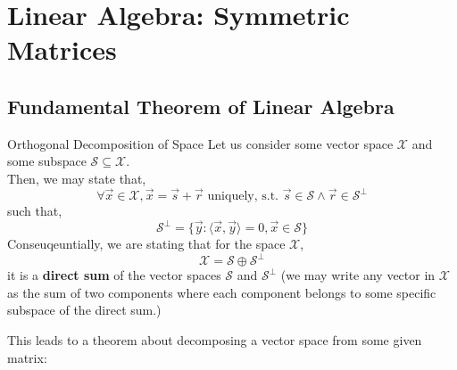 \chapter{Linear Algebra: Symmetric Matrices}

\section{Fundamental Theorem of Linear Algebra}
\begin{ln-theorem}{Orthogonal Decomposition of Space}{}
    Let us consider some vector space $\mathcal{X}$ and some subspace $\mathcal{S} \subseteq \mathcal{X}$. \\
    Then, we may state that,
    \[\forall \vec{x} \in \mathcal{X}, \vec{x} = \vec{s} + \vec{r} \text{ uniquely, s.t. } \vec{s} \in \mathcal{S} \land \vec{r} \in \mathcal{S}^\perp\]
    such that, 
    \[\mathcal{S}^\perp = \{\vec{y} : \langle \vec{x}, \vec{y} \rangle = 0, \vec{x} \in \mathcal{S}\}\]
    Conseuqeuntially, we are stating that for the space $\mathcal{X}$,
    \[\mathcal{X} = \mathcal{S} \oplus \mathcal{S}^\perp\]
    it is a \textbf{direct sum} of the vector spaces $\mathcal{S}$ and $\mathcal{S}^\perp$ (we may write any vector in $\mathcal{X}$ as the sum of two components where each component belongs to some specific subspace of the direct sum.)
\end{ln-theorem}
This leads to a theorem about decomposing a vector space from some given matrix:
